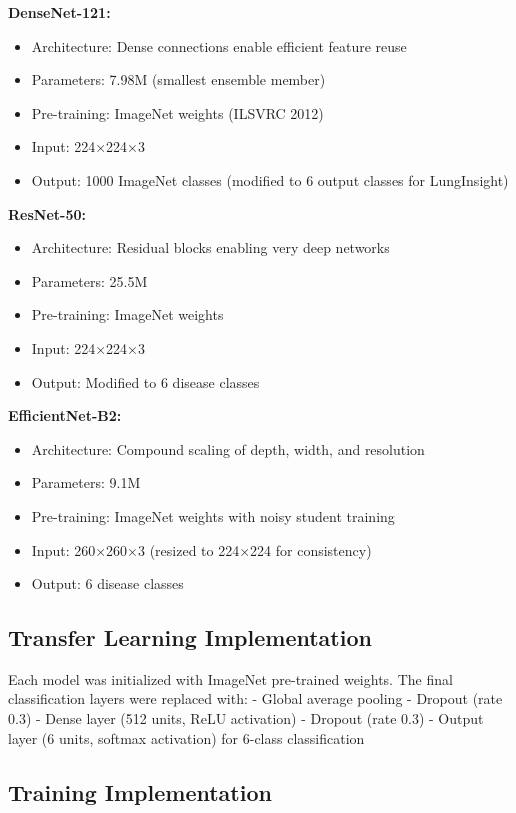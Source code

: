 {\textbf{DenseNet-121:}
\begin{itemize}
    \item Architecture: Dense connections enable efficient feature reuse
    \item Parameters: 7.98M (smallest ensemble member)
    \item Pre-training: ImageNet weights (ILSVRC 2012)
    \item Input: 224×224×3
    \item Output: 1000 ImageNet classes (modified to 6 output classes for LungInsight)
\end{itemize}

\textbf{ResNet-50:}
\begin{itemize}
    \item Architecture: Residual blocks enabling very deep networks
    \item Parameters: 25.5M
    \item Pre-training: ImageNet weights
    \item Input: 224×224×3
    \item Output: Modified to 6 disease classes
\end{itemize}

\textbf{EfficientNet-B2:}
\begin{itemize}
    \item Architecture: Compound scaling of depth, width, and resolution
    \item Parameters: 9.1M
    \item Pre-training: ImageNet weights with noisy student training
    \item Input: 260×260×3 (resized to 224×224 for consistency)
    \item Output: 6 disease classes
\end{itemize}

\subsection{Transfer Learning Implementation}

Each model was initialized with ImageNet pre-trained weights. The final classification layers were replaced with:
- Global average pooling
- Dropout (rate 0.3)
- Dense layer (512 units, ReLU activation)
- Dropout (rate 0.3)
- Output layer (6 units, softmax activation) for 6-class classification

\subsection{Training Implementation}

}
